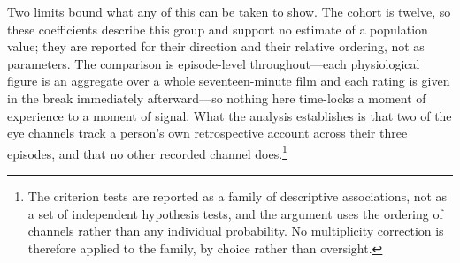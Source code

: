 Two limits bound what any of this can be taken to show. The cohort is twelve, so these
coefficients describe this group and support no estimate of a population value; they are
reported for their direction and their relative ordering, not as parameters. The
comparison is episode-level throughout---each physiological figure is an aggregate over a
whole seventeen-minute film and each rating is given in the break immediately afterward---so
nothing here time-locks a moment of experience to a moment of signal. What the analysis
establishes is that two of the eye channels track a person's own retrospective account across
their three episodes, and that no other recorded channel does.\footnote{The criterion tests are
reported as a family of descriptive associations, not as a set of independent hypothesis
tests, and the argument uses the ordering of channels rather than any individual probability.
No multiplicity correction is therefore applied to the family, by choice rather than
oversight.}

%

